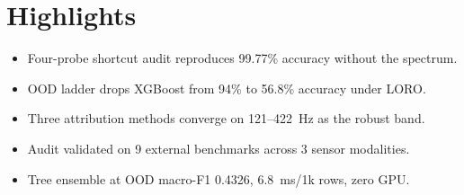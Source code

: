 \documentclass[12pt]{article}
\begin{document}
\section*{Highlights}

\begin{itemize}
  \item Four-probe shortcut audit reproduces 99.77\% accuracy without the spectrum.
  \item OOD ladder drops XGBoost from 94\% to 56.8\% accuracy under LORO.
  \item Three attribution methods converge on 121--422~Hz as the robust band.
  \item Audit validated on 9 external benchmarks across 3 sensor modalities.
  \item Tree ensemble at OOD macro-F1 0.4326, 6.8~ms/1k rows, zero GPU.
\end{itemize}
\end{document}
